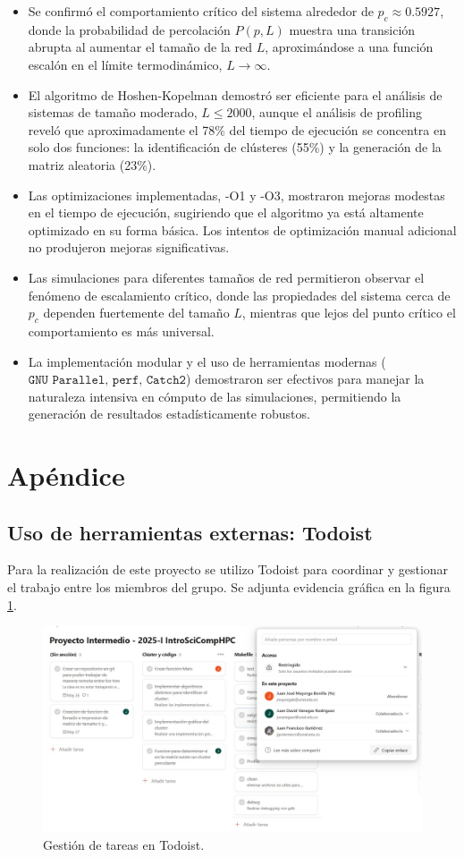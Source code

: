 \documentclass[12pt,a4paper]{article}
\begin{document}
\begin{itemize}
    \item Se confirmó el comportamiento crítico del sistema alrededor de $p_c \approx 0.5927$, donde la probabilidad de percolación $P(p,L)$ muestra una transición abrupta al aumentar el tamaño de la red $L$, aproximándose a una función escalón en el límite termodinámico, $L \rightarrow \infty$.

    \item El algoritmo de Hoshen-Kopelman demostró ser eficiente para el análisis de sistemas de tamaño moderado, $L \leq 2000$, aunque el análisis de profiling reveló que aproximadamente el 78\% del tiempo de ejecución se concentra en solo dos funciones: la identificación de clústeres (55\%) y la generación de la matriz aleatoria (23\%).

    \item Las optimizaciones implementadas, -O1 y -O3, mostraron mejoras modestas en el tiempo de ejecución, sugiriendo que el algoritmo ya está altamente optimizado en su forma básica. Los intentos de optimización manual adicional no produjeron mejoras significativas.

    \item Las simulaciones para diferentes tamaños de red permitieron observar el fenómeno de escalamiento crítico, donde las propiedades del sistema cerca de $p_c$ dependen fuertemente del tamaño $L$, mientras que lejos del punto crítico el comportamiento es más universal.

    \item La implementación modular y el uso de herramientas modernas ($\texttt{GNU Parallel, perf, Catch2}$) demostraron ser efectivos para manejar la naturaleza intensiva en cómputo de las simulaciones, permitiendo la generación de resultados estadísticamente robustos.
\end{itemize}

\section{Apéndice}

\subsection{Uso de herramientas externas: Todoist}
Para la realización de este proyecto se utilizo Todoist para coordinar y gestionar el trabajo entre los miembros del grupo. Se adjunta evidencia gráfica en la figura \ref{fig:7}.

\begin{figure}[H]
    \centering
    \includegraphics[width=0.9\linewidth]{../figures/todoist.png}
    \caption{Gestión de tareas en Todoist.}
    \label{fig:7}
\end{figure}



\end{document}
